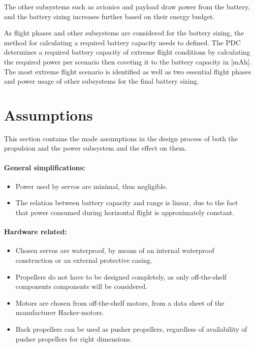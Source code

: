 The other subsystems such as avionics and payload draw power from the battery, and the battery sizing increases further based on their energy budget.

As flight phases and other subsystems are considered for the battery sizing, the method for calculating a required battery capacity needs to defined. The PDC determines a required battery capacity of extreme flight conditions by calculating the required power per scenario then coveting it to the battery capacity in [mAh]. The most extreme flight scenario is identified as well as two essential flight phases and power usage of other subsystems for the final battery sizing.

\section{Assumptions}
\label{sec:AssuPNP}
This section contains the made assumptions in the design process of both the propulsion and the power subsystem and the effect on them. 

\paragraph{General simplifications:}
\begin{itemize}
    \item Power used by servos are minimal, thus negligible.
    \item The relation between battery capacity and range is linear, due to the fact that power consumed during horizontal flight is approximately constant.
\end{itemize}

\paragraph{Hardware related:} 
\begin{itemize}
    \item Chosen servos are waterproof, by means of an internal waterproof construction or an external protective casing.
    \item Propellers do not have to be designed completely, as only off-the-shelf components components will be considered.
    \item Motors are chosen from off-the-shelf motors, from a data sheet of the manufacturer Hacker-motors.
    \item Back propellers can be used as pusher propellers, regardless of availability of pusher propellers for right dimensions.
\end{itemize}

